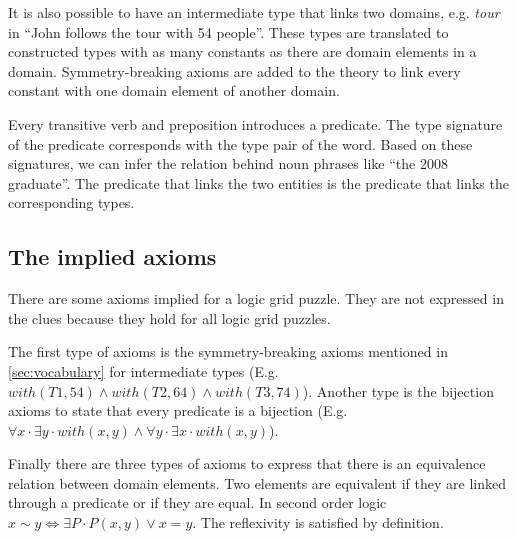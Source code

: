 
It is also possible to have an intermediate type that links two domains, e.g. \textit{tour} in ``John follows the tour with 54 people''. These types are translated to constructed types with as many constants as there are domain elements in a domain. Symmetry-breaking axioms are added to the theory to link every constant with one domain element of another domain.

Every transitive verb and preposition introduces a predicate. The type signature of the predicate corresponds with the type pair of the word.  Based on these signatures, we can infer the relation behind noun phrases like ``the 2008 graduate''. The predicate that links the two entities is the predicate that links the corresponding types. %

\subsection{The implied axioms}
There are some axioms implied for a logic grid puzzle. They are not expressed in the clues because they hold for all logic grid puzzles.

The first type of axioms is the symmetry-breaking axioms mentioned in \ref{sec:vocabulary} for intermediate types (E.g. $with(T1, 54) \land with(T2, 64) \land with(T3, 74)$). Another type is the bijection axioms to state that every predicate is a bijection (E.g. $\forall x \cdot \exists y \cdot with(x, y) \land \forall y \cdot \exists x \cdot with(x, y)$).

Finally there are three types of axioms to express that there is an equivalence relation between domain elements. Two elements are equivalent if they are linked through a predicate or if they are equal. In second order logic $x \sim y \Leftrightarrow \exists P \cdot P(x, y) \lor x = y$. The reflexivity is satisfied by definition.

